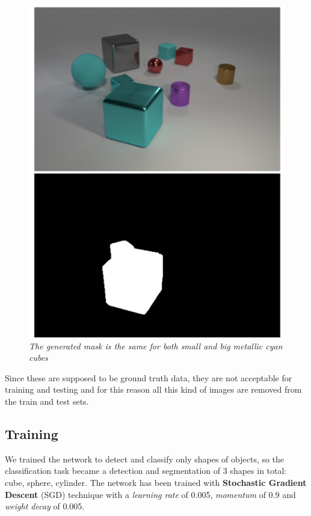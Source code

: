 \documentclass[10pt,twocolumn,letterpaper]{article}
\begin{document}
  \begin{figure}[h] %
    \centering
    \includegraphics[scale=0.5]{images/bad_preprocessing.png}
    \caption{\textit{The generated mask is the same for both small and big
    metallic cyan cubes}}
  \end{figure}
  \newpage Since these are supposed to be ground truth data, they are not acceptable for training 
  and testing and for this reason all this kind of images are removed from the train 
  and test sets.
\subsection*{Training}
  We trained the network to detect and classify only 
  shapes of objects, so the classification task became a detection
  and segmentation of 3 shapes in total:
  cube, sphere, cylinder.  
  The network has been trained with \textbf{Stochastic Gradient Descent}
  (SGD) technique with a \textit{learning rate} of 0.005,
    \textit{momentum} of 0.9 and \textit{weight decay} of 0.005.
\end{document}
